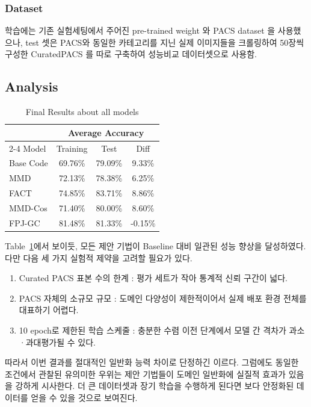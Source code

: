 \subsubsection{Dataset}
학습에는 기존 실험세팅에서 주어진 pre-trained weight 와 PACS dataset 을 사용했으나, test 셋은 PACS와 
동일한 카테고리를 지닌 실제 이미지들을 크롤링하여 50장씩 구성한 CuratedPACS 를 따로 구축하여 
성능비교 데이터셋으로 사용함. 

\subsection{Analysis}
\begin{table}[h]
  \centering
  \begin{tabular}{lccc}
    \toprule
    & \multicolumn{3}{c}{Average Accuracy} \\
    \cmidrule(r){2-4}
    Model & Training & Test & Diff \\
    \midrule
    Base Code  & 69.76\% & 79.09\% & 9.33\% \\
    MMD        & 72.13\% & 78.38\% & 6.25\% \\
    FACT       & 74.85\% & 83.71\% & 8.86\% \\
    MMD-Cos    & 71.40\% & 80.00\% & 8.60\% \\
    FPJ-GC     & 81.48\% & 81.33\% & -0.15\% \\
    \bottomrule
  \end{tabular}
  \caption{Final Results about all models}
  \label{tab:FinalResultsAllModels}
\end{table}

Table~\ref{tab:FinalResultsAllModels}에서 보이듯, 
모든 제안 기법이 Baseline 대비 일관된 성능 향상을 달성하였다. 다만 다음 세 가지 실험적 제약을 고려할 필요가 있다.

\begin{enumerate}
  \item Curated PACS 표본 수의 한계 : 평가 세트가 작아 통계적 신뢰 구간이 넓다.
  \item PACS 자체의 소규모 규모 : 도메인 다양성이 제한적이어서 실제 배포 환경 전체를 대표하기 어렵다.
  \item 10 epoch로 제한된 학습 스케줄 : 충분한 수렴 이전 단계에서 모델 간 격차가 과소·과대평가될 수 있다.
\end{enumerate}

따라서 이번 결과를 절대적인 일반화 능력 차이로 단정하긴 이르다. 그럼에도 동일한 조건에서 관찰된 유의미한 우위는 
제안 기법들이 도메인 일반화에 실질적 효과가 있음을 강하게 시사한다. 더 큰 데이터셋과 장기 학습을 수행하게 된다면 
보다 안정화된 데이터를 얻을 수 있을 것으로 보여진다.

